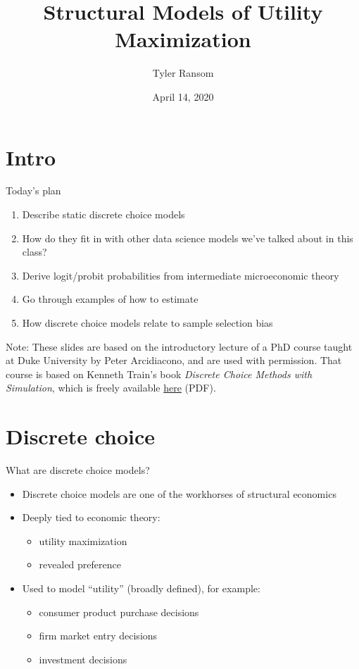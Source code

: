 \documentclass[english,aspectratio=169,12pt,xcolor=dvipsnames]{beamer}
\title{Structural Models of Utility Maximization}
\author{Tyler Ransom}
\institute[OU Econ]{\normalsize{University of Oklahoma, Dept. of Economics}}
\date{April 14, 2020}
\begin{document}
{
\frame[noframenumbering]{\titlepage}
}




\section{Intro}
\begin{frame}{Today's plan}
\begin{enumerate}
\item Describe static discrete choice models
\item How do they fit in with other data science models we've talked about in this class?
\item Derive logit/probit probabilities from intermediate microeconomic theory
\item Go through examples of how to estimate
\item How discrete choice models relate to sample selection bias
\end{enumerate}

\bigskip{}
\bigskip{}

\footnotesize{Note: These slides are based on the introductory lecture of a PhD course taught at Duke University by Peter Arcidiacono, and are used with permission. That course is based on Kenneth Train's book \emph{Discrete Choice Methods with Simulation}, which is freely available \href{https://eml.berkeley.edu/books/train1201.pdf}{here} (PDF).}
\end{frame}



\section{Discrete choice}
\begin{frame}{What are discrete choice models?}
\begin{itemize}
\item Discrete choice models are one of the workhorses of structural economics
\item Deeply tied to economic theory:
    \begin{itemize}
    \item utility maximization
    \item revealed preference
    \end{itemize}
\item Used to model ``utility'' (broadly defined), for example:
    \begin{itemize}
    \item consumer product purchase decisions
    \item firm market entry decisions
    \item investment decisions
    \end{itemize}
\end{itemize}
\end{frame}
\end{document}
